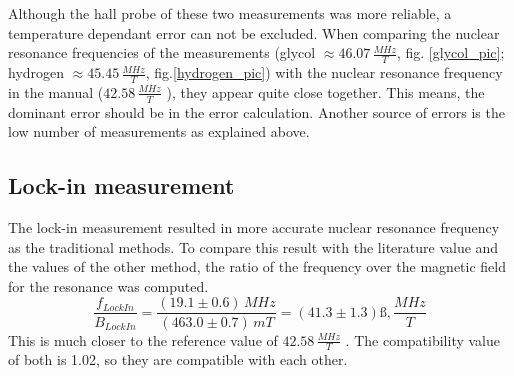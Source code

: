 Although the hall probe of these two measurements was more reliable, a temperature dependant error can not be excluded. When comparing the nuclear resonance frequencies of the measurements (glycol $\approx 46.07\,\frac{MHz}{T}$, fig. \ref{glycol_pic}; hydrogen $\approx 45.45\,\frac{MHz}{T}$, fig.\ref{hydrogen_pic}) with the nuclear resonance frequency in the manual ($42.58\,\frac{MHz}{T}$ \cite{anleitung}), they appear quite close together. This means, the dominant error should be in the error calculation. Another source of errors is the low number of measurements as explained above.

\subsection{Lock-in measurement}
The lock-in measurement resulted in more accurate nuclear resonance frequency as the traditional methods. To compare this result with the literature value and the values of the other method, the ratio of the frequency over the magnetic field for the resonance was computed.
\begin{equation}
	\frac{f_{LockIn}}{B_{LockIn}} = \frac{(19.1\pm0.6)\,{MHz}}{(463.0\pm0.7)\,{mT}} = (41.3\pm1.3)ß,\frac{MHz}{T}
\end{equation}
This is much closer to the reference value of $42.58\,\frac{MHz}{T}$ \cite{anleitung}. The compatibility value of both is 1.02, so they are compatible with each other.
